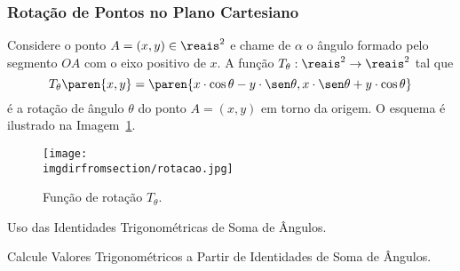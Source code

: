 \subsubsection{Rotação de Pontos no Plano Cartesiano}

\begin{definition}
Considere o ponto $A = (x, y) \in \reais^2$ e chame de $\alpha$ o ângulo
formado pelo segmento $OA$ com o eixo positivo de $x$. A função
$T_{\theta} : \reais^2 \to \reais^2$  tal que
$$T_{\theta}\paren{x, y} = \paren{x\cdot \cos \theta - y\cdot \sen \theta, x\cdot \sen \theta + y\cdot \cos
\theta}$$ é a rotação de ângulo $\theta$ do ponto $A = (x,y)$ em
torno da origem. O esquema é ilustrado na Imagem~\ref{img:funcao-rotacao}.
%
\begin{figure}[H]
\centering
\texttt{[image: \\imgdirfromsection/rotacao.jpg]}
\caption{Função de rotação $T_{\theta}$.}
\label{img:funcao-rotacao}
\end{figure}
    
\end{definition}

\begin{onlineact}
    {Uso das Identidades Trigonométricas de Soma de Ângulos}.
\end{onlineact}

\begin{onlineact}
    {Calcule Valores Trigonométricos a Partir de Identidades de Soma de Ângulos}.
\end{onlineact}